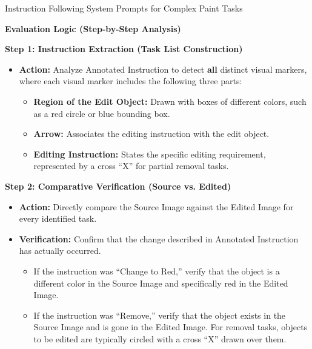 \documentclass{llmxive}
\begin{document}
\begin{promptbox}[label={System Prompts: IF_Complex Paint}]{Instruction Following System Prompts for Complex Paint Tasks}
\medskip

\textbf{Evaluation Logic (Step-by-Step Analysis)}

\medskip

\textbf{Step 1: Instruction Extraction (Task List Construction)}

\begin{itemize}[leftmargin=2.2em, labelsep=0.4em, itemsep=2pt]
    \item \textbf{Action:} Analyze Annotated Instruction to detect \textbf{all} distinct visual markers, where each visual marker includes the following three parts:
    
    \begin{itemize}
        \item \textbf{Region of the Edit Object:} Drawn with boxes of different colors, such as a red circle or blue bounding box.
        \item \textbf{Arrow:} Associates the editing instruction with the edit object.
        \item \textbf{Editing Instruction:} States the specific editing requirement, represented by a cross ``X'' for partial removal tasks.
    \end{itemize}
\end{itemize}

\medskip

\textbf{Step 2: Comparative Verification (Source vs. Edited)}

\begin{itemize}[leftmargin=2.2em, labelsep=0.4em, itemsep=2pt]
    \item \textbf{Action:} Directly compare the Source Image against the Edited Image for every identified task.
    
    \item \textbf{Verification:} Confirm that the change described in Annotated Instruction has actually occurred.
    
    \begin{itemize}
        \item If the instruction was ``Change to Red,'' verify that the object is a different color in the Source Image and specifically red in the Edited Image.
        
        \item If the instruction was ``Remove,'' verify that the object exists in the Source Image and is gone in the Edited Image. For removal tasks, objects to be edited are typically circled with a cross ``X'' drawn over them.
    \end{itemize}
    

\end{itemize}
\end{promptbox}
\end{document}
